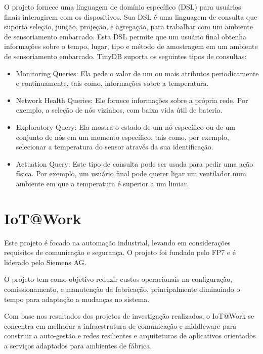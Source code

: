 O projeto fornece uma linguagem de domínio específico (DSL) para usuários
finais interagirem com os dispositivos. Sua DSL é uma linguagem de
consulta que suporta seleção, junção, projeção, e agregação, para
trabalhar com um ambiente de sensoriamento embarcado. Esta DSL permite
que um usuário final obtenha informações sobre o tempo, lugar, tipo
e método de amostragem em um ambiente de sensoriamento embarcado.
TinyDB suporta os seguintes tipos de consultas:
\begin{itemize}
\item Monitoring Queries: Ela pede o valor de um ou mais atributos periodicamente
e continuamente, tais como, informações sobre a temperatura.
\item Network Health Queries: Ele fornece informações sobre a própria rede.
Por exemplo, a seleção de nós vizinhos, com baixa vida útil de bateria.
\item Exploratory Query: Ela mostra o estado de um nó específico ou de um
conjunto de nós em um momento específico, tais como, por exemplo,
selecionar a temperatura do sensor através da sua identificação.
\item Actuation Query: Este tipo de consulta pode ser usada para pedir uma
ação física. Por exemplo, um usuário final pode querer ligar um ventilador
num ambiente em que a temperatura é superior a um limiar. 
\end{itemize}

\section{IoT@Work}

Este projeto é focado na automação industrial, levando em considerações
requisitos de comunicação e segurança. O projeto foi fundado pelo
FP7 e é liderado pelo Siemens AG\cite{IoTWork:site}\cite{rotondi2011project}.

O projeto tem como objetivo reduzir custos operacionais na configuração,
comissionamento, e manutenção da fabricação, principalmente diminuindo
o tempo para adaptação a mudanças no sistema.

Com base nos resultados dos projetos de investigação realizados, o
IoT@Work se concentra em melhorar a infraestrutura de comunicação
e middleware para construir a auto-gestão e redes resilientes e arquiteturas
de aplicativos orientados a serviços adaptados para ambientes de fábrica.

